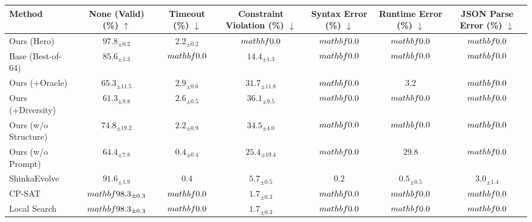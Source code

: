\begin{tabular}{lcccccc}
\toprule
Method & None (Valid) (\%) $\uparrow$ & Timeout (\%) $\downarrow$ & Constraint Violation (\%) $\downarrow$ & Syntax Error (\%) $\downarrow$ & Runtime Error (\%) $\downarrow$ & JSON Parse Error (\%) $\downarrow$ \\
\midrule
Ours (Hero) & $97.8_{\pm 0.2}$ & $2.2_{\pm 0.2}$ & $\\mathbf{0.0}$ & $\\mathbf{0.0}$ & $\\mathbf{0.0}$ & $\\mathbf{0.0}$ \\
Base (Best-of-64) & $85.6_{\pm 1.3}$ & $\\mathbf{0.0}$ & $14.4_{\pm 1.3}$ & $\\mathbf{0.0}$ & $\\mathbf{0.0}$ & $\\mathbf{0.0}$ \\
Ours (+Oracle) & $65.3_{\pm 11.5}$ & $2.9_{\pm 0.6}$ & $31.7_{\pm 11.8}$ & $\\mathbf{0.0}$ & $3.2$ & $\\mathbf{0.0}$ \\
Ours (+Diversity) & $61.3_{\pm 9.8}$ & $2.6_{\pm 0.5}$ & $36.1_{\pm 9.5}$ & $\\mathbf{0.0}$ & $\\mathbf{0.0}$ & $\\mathbf{0.0}$ \\
Ours (w/o Structure) & $74.8_{\pm 19.2}$ & $2.2_{\pm 0.9}$ & $34.5_{\pm 4.0}$ & $\\mathbf{0.0}$ & $\\mathbf{0.0}$ & $\\mathbf{0.0}$ \\
Ours (w/o Prompt) & $64.4_{\pm 7.8}$ & $0.4_{\pm 0.4}$ & $25.4_{\pm 19.4}$ & $\\mathbf{0.0}$ & $29.8$ & $\\mathbf{0.0}$ \\
ShinkaEvolve & $91.6_{\pm 1.9}$ & $0.4$ & $5.7_{\pm 0.5}$ & $0.2$ & $0.5_{\pm 0.5}$ & $3.0_{\pm 1.4}$ \\
CP-SAT & $\\mathbf{98.3_{\pm 0.3}}$ & $\\mathbf{0.0}$ & $1.7_{\pm 0.3}$ & $\\mathbf{0.0}$ & $\\mathbf{0.0}$ & $\\mathbf{0.0}$ \\
Local Search & $\\mathbf{98.3_{\pm 0.3}}$ & $\\mathbf{0.0}$ & $1.7_{\pm 0.3}$ & $\\mathbf{0.0}$ & $\\mathbf{0.0}$ & $\\mathbf{0.0}$ \\

\end{tabular}
